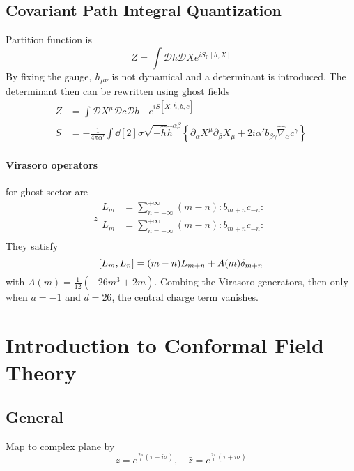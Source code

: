 \documentclass[12pt, a4paper, DIV=15]{article}
\numberwithin{equation}{section}
\newcommand{\normord}[1]{:\mathrel{#1}:}
\begin{document}
\subsection{Covariant Path Integral Quantization}
Partition function is
\begin{equation}
	Z = \int \mathcal{D}h \mathcal{D}X e^{iS_\text{P}[h,X]}
\end{equation}
By fixing the gauge, $h_{\mu\nu}$ is not dynamical and a determinant is introduced. The determinant then can be rewritten using ghost fields
\begin{subequations}
\begin{align}
	Z &= \int \mathcal{D}X^\mu \mathcal{D}c \mathcal{D} b \quad e^{i S[X, \hat{h}, b, c]} \\
	S &= - \frac{1}{4\pi \alpha'} \int \dd[2]{\sigma} \sqrt{-\hat{h}} \hat{h}^{\alpha\beta} \left\{ \partial_\alpha X^\mu \partial_\beta X_\mu + 2 i \alpha' b_{\beta\gamma} \hat{\nabla}_\alpha c^\gamma \right\}
\end{align}
\end{subequations}
\paragraph{Virasoro operators} for ghost sector are
\begin{subequations}
z\begin{align}
	L_m &= \sum_{n=-\infty}^{+\infty} (m-n) \normord{b_{m+n}c_{-n}} \\
	\bar{L}_m &= \sum_{n=-\infty}^{+\infty} (m-n) \normord{\bar{b}_{m+n} \bar{c}_{-n}} \\
\end{align}
\end{subequations}
They satisfy 
\begin{equation}
	\comm{L_m}{L_n} = (m-n) L_{m+n} + A(m) \delta_{m+n}
\end{equation}
with $A(m) = \frac{1}{12}(-26 m^3 + 2m)$. Combing the Virasoro generators, then only when $a=-1$ and $d=26$, the central charge term vanishes.

\section{Introduction to Conformal Field Theory}
\subsection{General}
Map to complex plane by
\begin{equation}
	z = e^{\frac{2\pi}{l}(\tau - i \sigma)}, \quad \bar{z} = e^{\frac{2\pi}{l}(\tau + i \sigma)}
\end{equation}
\end{document}
